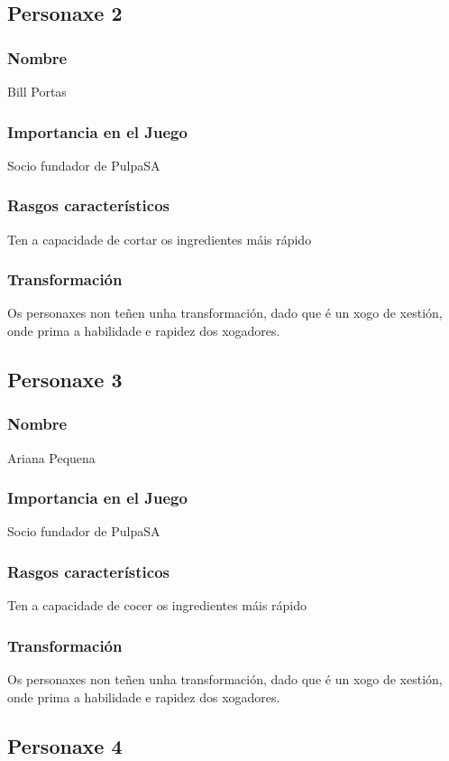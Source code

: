 \documentclass{report}  %
\begin{document}
\subsection{Personaxe 2}
\subsubsection{Nombre}
Bill Portas
\subsubsection{Importancia en el Juego}
Socio fundador de PulpaSA
\subsubsection{Rasgos característicos}
Ten a capacidade de cortar os ingredientes máis rápido
\subsubsection{Transformación}
Os personaxes non teñen unha transformación, dado que é un xogo de xestión, onde prima a habilidade e rapidez dos xogadores.


\subsection{Personaxe 3}
\subsubsection{Nombre}
Ariana Pequena
\subsubsection{Importancia en el Juego}
Socio fundador de PulpaSA

\subsubsection{Rasgos característicos}
Ten a capacidade de cocer os ingredientes máis rápido
\subsubsection{Transformación}
Os personaxes non teñen unha transformación, dado que é un xogo de xestión, onde prima a habilidade e rapidez dos xogadores.


\subsection{Personaxe 4}
\end{document}
